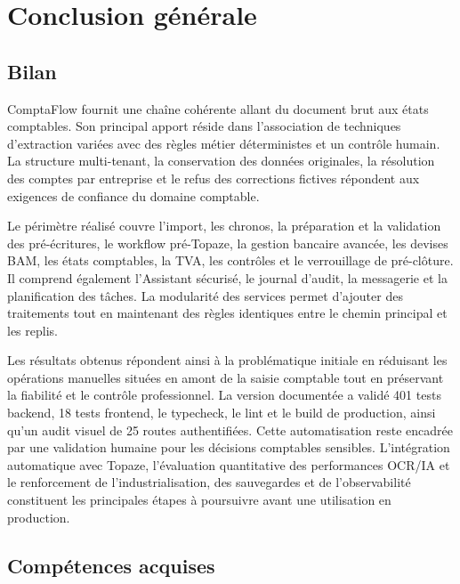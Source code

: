 \documentclass[12pt,a4paper,oneside]{report}
\begin{document}
\chapter{Conclusion générale}

\section{Bilan}

ComptaFlow fournit une chaîne cohérente allant du document brut aux états comptables. Son principal apport réside dans l'association de techniques d'extraction variées avec des règles métier déterministes et un contrôle humain. La structure multi-tenant, la conservation des données originales, la résolution des comptes par entreprise et le refus des corrections fictives répondent aux exigences de confiance du domaine comptable.

Le périmètre réalisé couvre l'import, les chronos, la préparation et la validation des pré-écritures, le workflow pré-Topaze, la gestion bancaire avancée, les devises BAM, les états comptables, la TVA, les contrôles et le verrouillage de pré-clôture. Il comprend également l'Assistant sécurisé, le journal d'audit, la messagerie et la planification des tâches. La modularité des services permet d'ajouter des traitements tout en maintenant des règles identiques entre le chemin principal et les replis.

Les résultats obtenus répondent ainsi à la problématique initiale en réduisant les opérations manuelles situées en amont de la saisie comptable tout en préservant la fiabilité et le contrôle professionnel. La version documentée a validé 401 tests backend, 18 tests frontend, le typecheck, le lint et le build de production, ainsi qu'un audit visuel de 25 routes authentifiées. Cette automatisation reste encadrée par une validation humaine pour les décisions comptables sensibles. L'intégration automatique avec Topaze, l'évaluation quantitative des performances OCR/IA et le renforcement de l'industrialisation, des sauvegardes et de l'observabilité constituent les principales étapes à poursuivre avant une utilisation en production.

\section{Compétences acquises}
\end{document}
